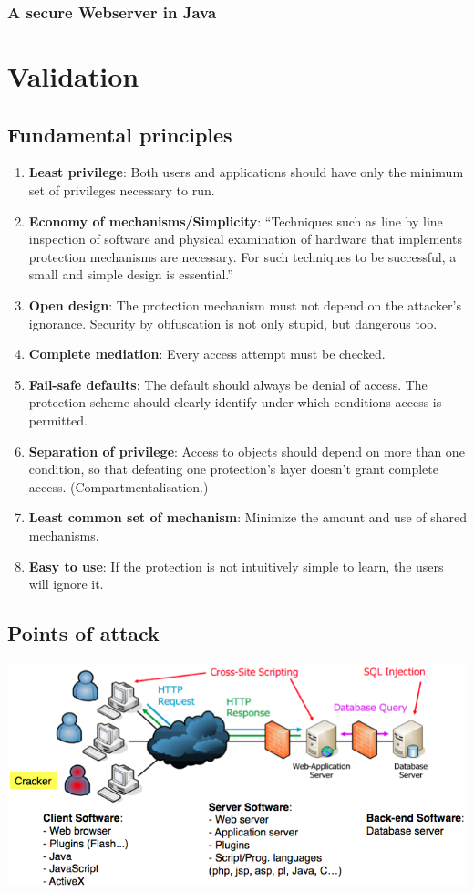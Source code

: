 \documentclass[10pt]{article}
\begin{document}
\subsubsection{A secure Webserver in Java}


\newpage
\section{Validation}
\subsection{Fundamental principles}
\begin{enumerate}
	\item \textbf{Least privilege}: Both users and applications should have only the minimum set of privileges necessary to run.
	\item \textbf{Economy of mechanisms/Simplicity}: “Techniques such as line by line inspection of software and physical examination of hardware that implements protection mechanisms are necessary. For such techniques to be successful, a small and simple design is essential.”
	\item \textbf{Open design}: The protection mechanism must not depend on the attacker’s ignorance. Security by obfuscation is not only stupid, but dangerous too.
	\item \textbf{Complete mediation}: Every access attempt must be checked.
	\item \textbf{Fail-safe defaults}: The default should always be denial of access. The protection scheme should clearly identify under which conditions access is permitted.
	\item \textbf{Separation of privilege}: Access to objects should depend on more than one condition, so that defeating one protection’s layer doesn’t grant complete access. (Compartmentalisation.)
	\item \textbf{Least common set of mechanism}: Minimize the amount and use of shared mechanisms.
	\item \textbf{Easy to use}: If the protection is not intuitively simple to learn, the users will ignore it.
\end{enumerate}
\subsection{Points of attack}
\begin{center}
	\includegraphics[scale=0.5]{points_of_attac.png}
\end{center}
\end{document}
